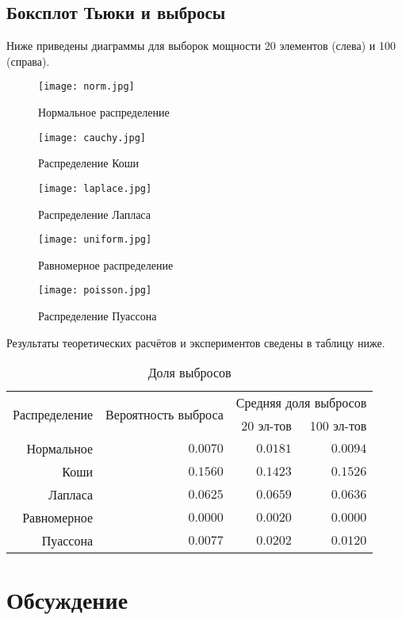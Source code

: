 \documentclass[zuev_report2.tex]{subfiles}
\begin{document}
\subsection{Боксплот Тьюки и выбросы}
Ниже приведены диаграммы для выборок мощности 20 элементов (слева) и 100 (справа). 
\begin{figure}[H]
	\centering \texttt{[image: norm.jpg]}
	\caption{Нормальное распределение}
	\label{img:norm}
\end{figure}
\begin{figure}[H]
	\centering \texttt{[image: cauchy.jpg]}
	\caption{Распределение Коши}
	\label{img:cauchy}
\end{figure}
\begin{figure}[H]
	\centering \texttt{[image: laplace.jpg]}
	\caption{Распределение Лапласа}
	\label{img:laplace}
\end{figure}
\begin{figure}[H]
	\centering \texttt{[image: uniform.jpg]}
	\caption{Равномерное распределение}
	\label{img:uniform}
\end{figure}
\begin{figure}[H]
	\centering \texttt{[image: poisson.jpg]}
	\caption{Распределение Пуассона}
	\label{img:poisson}
\end{figure}
\newpage

Результаты теоретических расчётов и экспериментов сведены в таблицу ниже.
\begin{table}[H]
\centering
\caption{Доля выбросов}
\begin{tabular}{*4r}
	\toprule
	\multirow{2}{*}{Распределение}&
	\multirow{2}{*}{Вероятность выброса}&
	\multicolumn{2}{r}{Средняя доля выбросов}\tabularnewline
	& & 20 эл-тов & 100 эл-тов\\
	\midrule
	Нормальное  & $0.0070$ & $0.0181$ & $0.0094$ \\
	Коши        & $0.1560$ & $0.1423$ & $0.1526$ \\
	Лапласа     & $0.0625$ & $0.0659$ & $0.0636$ \\
	Равномерное & $0.0000$ & $0.0020$ & $0.0000$ \\
	Пуассона    & $0.0077$ & $0.0202$ & $0.0120$ \\
	\bottomrule
\end{tabular}
\label{table:outliers}
\end{table}

\newpage
\section{Обсуждение}
\end{document}
